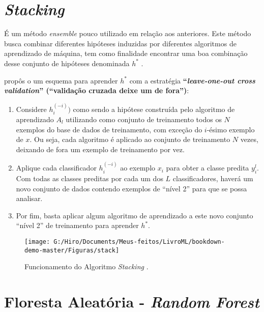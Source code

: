 \documentclass[
  openany]{book}
\begin{document}
\hypertarget{stacking}{%
\section{\texorpdfstring{\emph{Stacking}}{Stacking}}\label{stacking}}

É um método \emph{ensemble} pouco utilizado em relação aos anteriores. Este método busca combinar diferentes hipóteses induzidas por diferentes algoritmos de aprendizado de máquina, tem como finalidade encontrar uma boa combinação desse conjunto de hipóteses denominada \(h^*\) \citep{bernardini2002combinaccao}.

\citet{wolpert1992stacked} propôs o um esquema para aprender \(h^*\) com a estratégia \textbf{``\emph{leave-one-out cross validation}'' (``validação cruzada deixe um de fora'')}:

\begin{enumerate}
\def\labelenumi{\arabic{enumi}.}
\item
  Considere \(h_i^{(-i)})\) como sendo a hipótese construída pelo algoritmo de aprendizado \(A_l\) utilizando como conjunto de treinamento todos os \(N\) exemplos do base de dados de treinamento, com exceção do \(i\)-ésimo exemplo de \(x\). Ou seja, cada algoritmo é aplicado ao conjunto de treinamento \(N\) vezes, deixando de fora um exemplo de treinamento por vez.
\item
  Aplique cada classificador \(h_i^{(-i)}\) ao exemplo \(x_i\) para obter a classe predita \(y_i^l\). Com todas as classes preditas por cada um dos \(L\) classificadores, haverá um novo conjunto de dados contendo exemplos de ``nível 2'' para que se possa analisar.
\item
  Por fim, basta aplicar algum algoritmo de aprendizado a este novo conjunto ``nível 2'' de treinamento para aprender \(h^*\).
\end{enumerate}

\begin{figure}

{\centering \texttt{[image: G:/Hiro/Documents/Meus-feitos/LivroML/bookdown-demo-master/Figuras/stack]} 

}

\caption{Funcionamento do Algoritmo \emph{Stacking} \citep{bernardini2002combinaccao}.}\label{fig:stack}
\end{figure}



\hypertarget{rf}{%
\section{\texorpdfstring{Floresta Aleatória - \emph{Random Forest}}{Floresta Aleatória - Random Forest}}\label{rf}}
\end{document}
